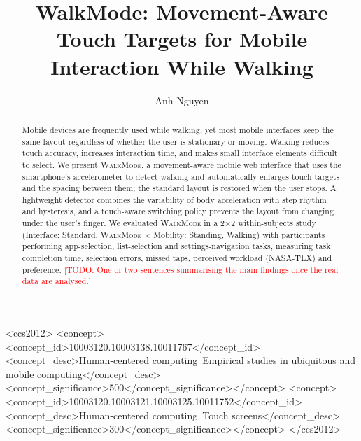 \documentclass[sigconf,nonacm]{acmart}
\newcommand{\todo}[1]{\textcolor{red}{[TODO: #1]}}
\newcommand{\WM}{\textsc{WalkMode}}
\begin{document}
\title{WalkMode: Movement-Aware Touch Targets for Mobile Interaction While Walking}

\author{Anh Nguyen}

\begin{abstract}
Mobile devices are frequently used while walking, yet most mobile interfaces keep the same layout regardless of whether the user is stationary or moving. Walking reduces touch accuracy, increases interaction time, and makes small interface elements difficult to select. We present \WM{}, a movement-aware mobile web interface that uses the smartphone's accelerometer to detect walking and automatically enlarges touch targets and the spacing between them; the standard layout is restored when the user stops. A lightweight detector combines the variability of body acceleration with step rhythm and hysteresis, and a touch-aware switching policy prevents the layout from changing under the user's finger. We evaluated \WM{} in a 2$\times$2 within-subjects study (Interface: Standard, \WM{} $\times$ Mobility: Standing, Walking) with \NP{} participants performing app-selection, list-selection and settings-navigation tasks, measuring task completion time, selection errors, missed taps, perceived workload (NASA-TLX) and preference. \todo{One or two sentences summarising the main findings once the real data are analysed.}
\end{abstract}

\begin{CCSXML}
<ccs2012>
<concept><concept_id>10003120.10003138.10011767</concept_id>
<concept_desc>Human-centered computing~Empirical studies in ubiquitous and mobile computing</concept_desc>
<concept_significance>500</concept_significance></concept>
<concept><concept_id>10003120.10003121.10003125.10011752</concept_id>
<concept_desc>Human-centered computing~Touch screens</concept_desc>
<concept_significance>300</concept_significance></concept>
</ccs2012>
\end{CCSXML}


\maketitle
\end{document}
